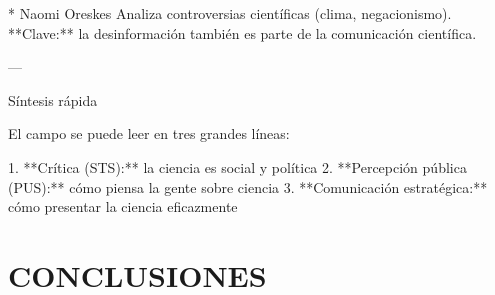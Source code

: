 \documentclass[11pt,                                                            
 superscriptaddress,twoside,
 amsmath,amssymb,
 aps, physrev
]{revtex4-2}
\begin{document}
* Naomi Oreskes
Analiza controversias científicas (clima, negacionismo).
**Clave:** la desinformación también es parte de la comunicación científica.

---

 Síntesis rápida

El campo se puede leer en tres grandes líneas:

1. **Crítica (STS):** la ciencia es social y política
2. **Percepción pública (PUS):** cómo piensa la gente sobre ciencia
3. **Comunicación estratégica:** cómo presentar la ciencia eficazmente





\section{CONCLUSIONES}


\end{document}
